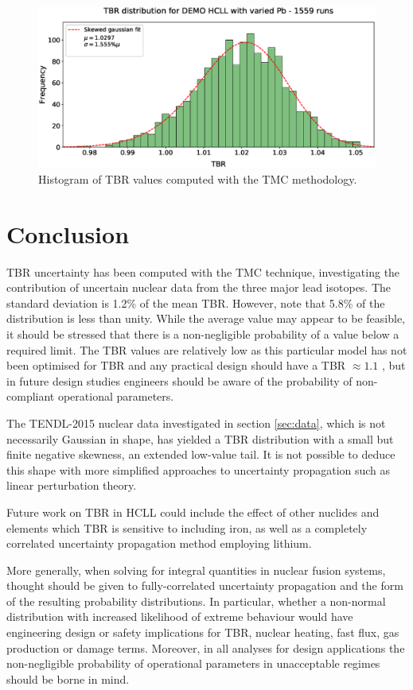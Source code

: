 \begin{figure}
	\includegraphics[width=\textwidth]{hcll_hist_1559}
	\caption{Histogram of TBR values computed with the TMC methodology.}
	\label{fig:tbr_distribution}
\end{figure}

\section{Conclusion}
TBR uncertainty has been computed with the TMC technique, investigating the contribution of uncertain nuclear data from the three major lead isotopes. The standard deviation is 1.2\% of the mean TBR. However, note that 5.8\% of the distribution is less than unity. While the average value may appear to be feasible, it should be stressed that there is a non-negligible probability of a value below a required limit. The TBR values are relatively low as this particular model has not been optimised for TBR and any practical design should have a TBR $\approx 1.1$ \cite{Fischer2015}, but in future design studies engineers should be aware of the probability of non-compliant operational parameters. 

The TENDL-2015 nuclear data investigated in section \ref{sec:data}, which is not necessarily Gaussian in shape, has yielded a TBR distribution with a small but finite negative skewness, an extended low-value tail. It is not possible to deduce this shape with more simplified approaches to uncertainty propagation such as linear perturbation theory.

Future work on TBR in HCLL could include the effect of other nuclides and elements which TBR is sensitive to including iron, as well as a completely correlated uncertainty propagation method employing lithium. 

More generally, when solving for integral quantities in nuclear fusion systems, thought should be given to fully-correlated uncertainty propagation and the form of the resulting probability distributions. In particular, whether a non-normal distribution with increased likelihood of extreme behaviour would have engineering design or safety implications for TBR, nuclear heating, fast flux, gas production or damage terms. Moreover, in all analyses for design applications the non-negligible probability of operational parameters in unacceptable regimes should be borne in mind.

